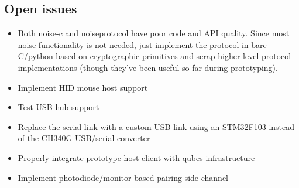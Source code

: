 \documentclass[12pt,a4paper,notitlepage]{article}
\begin{document}
\subsection{Open issues}
\begin{itemize}
    \item Both noise-c and noiseprotocol have poor code and API quality. Since most noise functionality is not needed,
        just implement the protocol in bare C/python based on cryptographic primitives and scrap higher-level protocol
        implementations (though they've been useful so far during prototyping).
    \item Implement HID mouse host support
    \item Test USB hub support
    \item Replace the serial link with a custom USB link using an STM32F103 instead of the CH340G USB/serial converter
    \item Properly integrate prototype host client with qubes infrastructure
    \item Implement photodiode/monitor-based pairing side-channel
\end{itemize}
\end{document}
